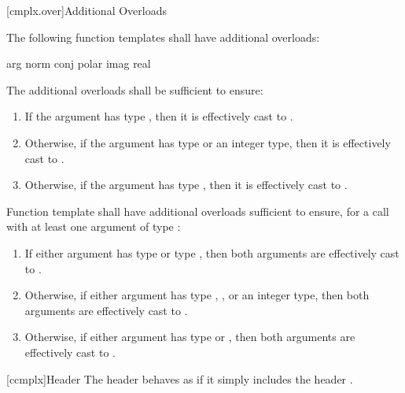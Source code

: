 \documentclass[american,twoside]{book}
\begin{document}
\begin{paras}
[cmplx.over]{\marktr{}Additional Overloads}

\pnum
{}%
%
%
%
%
%
The following function templates shall have additional overloads:
\begin{codeblock}
  arg                   norm 
  conj                  polar 
  imag                  real 
\end{codeblock}

\pnum
{}%
The additional overloads shall be sufficient to ensure:

\begin{enumerate}
        \item{If the argument has type , then it is effectively 
              cast to .}
        \item{Otherwise, if the argument has type  or an integer type,
              then it is effectively cast to .}
        \item{Otherwise, if the argument has type , then it is 
              effectively cast to .}
\end{enumerate}

\pnum
{}%
Function template  shall have additional overloads sufficient to
ensure, for a call with at least one argument of type :

\begin{enumerate}

  \item{If either argument has type  or type , then both arguments are effectively cast to
        .}
  \item{Otherwise, if either argument has type , ,
        or an integer type, then both arguments are effectively cast to
        .}
  \item{Otherwise, if either argument has type  or ,
        then both arguments are effectively cast to .}
\end{enumerate}

[ccmplx]{\marktr{}Header }
\pnum
{}%
The header behaves as if it simply includes the header .


\end{paras}
\end{document}
